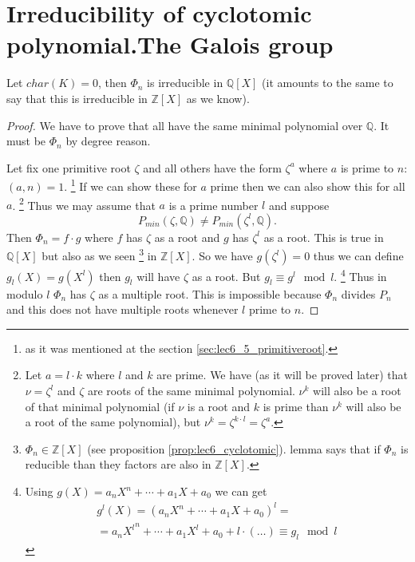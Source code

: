 \section{Irreducibility of cyclotomic polynomial.The Galois group}

\begin{theorem}
  Let $char(K) = 0$, then $\Phi_n$ is irreducible in
  $\mathbb{Q}\left[X\right]$
  (it amounts to the same to say that this is irreducible in
  $\mathbb{Z}\left[X\right]$ as we know).
  \begin{proof}
    We have to prove that all  have
    the same minimal polynomial over $\mathbb{Q}$. It must be $\Phi_n$
    by degree reason.

    Let fix one primitive root $\zeta$ and all others have the form
    $\zeta^a$ where $a$ is prime to $n$: $\left(a,n\right)=1$.
    \footnote{
      as it was mentioned at the section \ref{sec:lec6_5_primitiveroot}.
    }
    If we
    can show these for $a$ 
    prime then we can also show this for all $a$.
    \footnote{
      Let $a = l \cdot k$ where $l$ and $k$ are prime. We have (as it
      will be proved later) that $\nu = \zeta^l$ and $\zeta$ are roots of the
      same minimal polynomial. $\nu^k$ will also be a root of that
      minimal polynomial (if $\nu$ is a root and $k$ is prime than
      $\nu^k$ will also be a root of the same polynomial), but
      $\nu^k = \zeta^{k \cdot l} = \zeta^a$.
    }
    Thus we may
    assume that $a$ is a prime number $l$
    and suppose
    \[
    P_{min}\left(\zeta, \mathbb{Q}\right)
    \ne
    P_{min}\left(\zeta^l, \mathbb{Q}\right).
    \]
    Then $\Phi_n = f \cdot g$ where $f$ has $\zeta$ as a root and $g$
    has $\zeta^l$ as a root. This is true in
    $\mathbb{Q}\left[X\right]$ but also as we seen
    \footnote{
      $\Phi_n \in \mathbb{Z}\left[X\right]$ (see proposition
      \ref{prop:lec6_cyclotomic}).  lemma says that
      if $\Phi_n$ is reducible than they factors are also in
      $\mathbb{Z}\left[X\right]$.
    }
    in
    $\mathbb{Z}\left[X\right]$. So we have $g\left(\zeta^l\right) = 0$
    thus we can define $g_l\left(X\right) = g\left(X^l\right)$ then
    $g_l$ will have $\zeta$ as a root. But $g_l \equiv g^l \mod l$.
    \footnote{
      Using $g\left(X\right) = a_n X^n + \cdots + a_1 X + a_0$ we can get
      \begin{eqnarray}
        g^l\left(X\right) = \left(a_n X^n + \cdots + a_1 X +
        a_0\right)^l =
        \nonumber \\
        = a_n {X^l}^n + \cdots + a_1 {X^l} +
        a_0 + l \cdot \left( \dots \right) \equiv g_l \mod l
        \nonumber
      \end{eqnarray}
    }
    Thus in
    modulo $l$ $\Phi_n$ has $\zeta$ as a multiple root. This is
    impossible because $\Phi_n$ divides $P_n$ and this does not have
    multiple roots whenever $l$ prime to $n$. 
  \end{proof}
  \label{thm:lec6_2}
\end{theorem}

